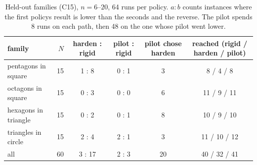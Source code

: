\begin{table}[t]\centering\small
\begin{tabular}{lrcccc}
\toprule
family & $N$ & harden : rigid & pilot : rigid & pilot chose harden & reached (rigid / harden / pilot) \\
\midrule
pentagons in square & 15 & 1 : 8 & 0 : 1 & 3 & 8 / 4 / 8 \\
octagons in square & 15 & 0 : 3 & 0 : 0 & 6 & 11 / 9 / 11 \\
hexagons in triangle & 15 & 0 : 2 & 0 : 1 & 8 & 10 / 9 / 10 \\
triangles in circle & 15 & 2 : 4 & 2 : 1 & 3 & 11 / 10 / 12 \\
\midrule
all & 60 & 3 : 17 & 2 : 3 & 20 & 40 / 32 / 41 \\
\bottomrule
\end{tabular}
\caption{Held-out families (C15), $n=6$--$20$, 64 runs per policy. $a:b$ counts instances where the first policy\textquotesingle s result is lower than the second\textquotesingle s and the reverse. The pilot spends 8 runs on each path, then 48 on the one whose pilot went lower.}
\label{tab:decision}
\end{table}
